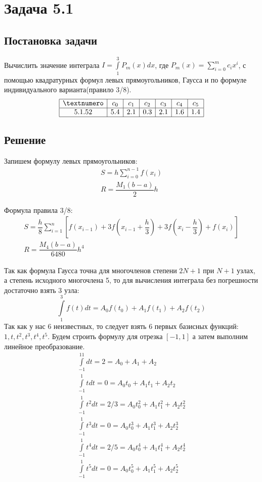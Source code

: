 \section*{Задача 5.1}
\subsection*{Постановка задачи}
Вычислить значение интеграла $I = \int\limits_1^3P_m(x)dx$, где $P_m(x) = \sum\limits_{i=0}^mc_ix^i$, с помощью квадратурных формул левых прямоугольников, Гаусса и по формуле индивидуального варианта(правило 3/8).
\[
\begin{array}{| c | c | c | c | c | c | c |}
	\hline
	   №    & c_0 & c_1 & c_2 & c_3 & c_4 & c_5 \\ \hline
	5.1.52 &  5.4 & 2.1 & 0.3 &  2.1 & 1.6 & 1.4 \\ \hline
\end{array}
\]
\subsection*{Решение}
 Запишем формулу левых прямоугольников:
\begin{gather*}
	S = h\sum\limits_{i=0}^{n-1}f(x_i) \\
	R = \dfrac{M_1(b-a)}{2}h
\end{gather*}

Формула правила 3/8:
\begin{gather*}
	S = \dfrac{h}{8}\sum\limits_{i=1}^n\left[f(x_{i-1}) + 3f\left(x_{i-1} + \dfrac{h}{3}\right) + 3f\left(x_i - \dfrac{h}{3}\right) + f(x_i)\right]\\
	R = \dfrac{M_4(b-a)}{6480}h^4
\end{gather*}

Так как формула Гаусса точна для многочленов степени $2N + 1$ при $N + 1$ узлах, а степень исходного многочлена 5, то для вычисления интеграла без погрешности достаточно взять 3 узла:
\[
	\int\limits_1^3f(t)dt = A_0f(t_0) + A_1f(t_1) + A_2f(t_2)
\]
Так как у нас 6 неизвестных, то следует взять 6 первых базисных функций: $1, t, t^2, t^3, t^4, t^5$. Будем строить формулу для отрезка $[-1, 1]$ а затем выполним линейное преобразование.
\begin{gather*}
	\int\limits_{-1}^11dt = 2 =A_0 + A_1 + A_2 \\
	\int\limits_{-1}^1tdt = 0 =A_0t_0 + A_1t_1 + A_2t_2 \\
	\int\limits_{-1}^1t^2dt = 2/3 = A_0t_0^2 + A_1t_1^2 + A_2t_2^2 \\
	\int\limits_{-1}^1t^3dt = 0 = A_0t_0^3 + A_1t_1^3 + A_2t_2^3 \\
	\int\limits_{-1}^1t^4dt = 2/5 = A_0t_0^4 + A_1t_1^4 + A_2t_2^4 \\
	\int\limits_{-1}^1t^5dt = 0 = A_0t_0^5 + A_1t_1^5 + A_2t_2^5
\end{gather*}

